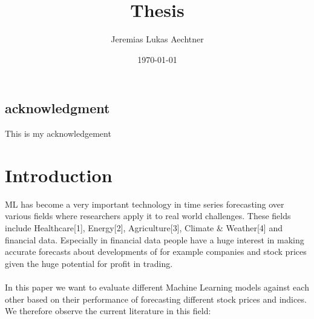 \documentclass[a4paper,12pt]{report}
\title{Thesis}
\author{Jeremias Lukas Aechtner}
\date{\today}
\begin{document}
\maketitle


\section*{acknowledgment}
This is my acknowledgement
\newpage

\tableofcontents
\newpage






\chapter{Introduction}
ML has become a very important technology in time series forecasting over various fields where researchers apply it to real world challenges. These fields include Healthcare[1], Energy[2], Agriculture[3], Climate \& Weather[4] and financial data. Especially in financial data people have a huge interest in making accurate forecasts about developments of for example companies and stock prices given the huge potential for profit in trading. \\\\
In this paper we want to evaluate different Machine Learning models against each other based on their performance of forecasting different stock prices and indices. We therefore observe the current literature in this field:
\end{document}
